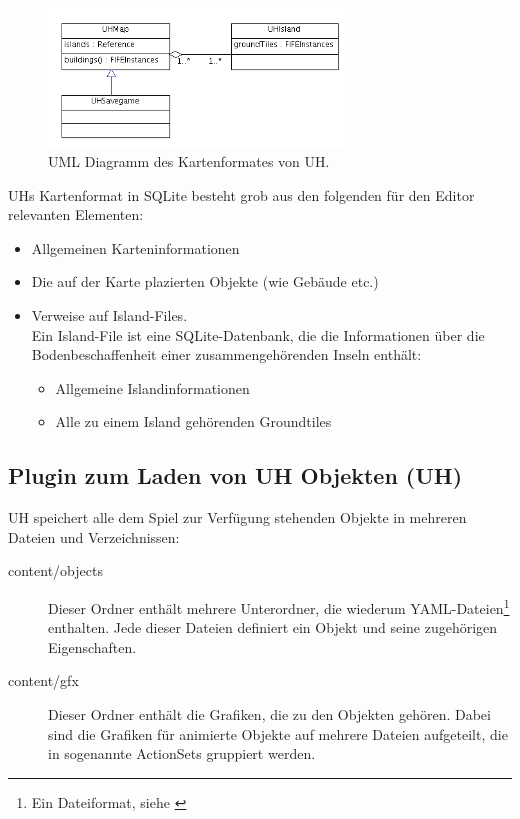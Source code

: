 %
%
\begin{figure}[htbp]
  \centering

    \includegraphics[width=0.7\textwidth]{gfx/klassendiagramm-UHSaveGame.png}

  \caption{UML Diagramm des Kartenformates von UH.}
  \label{figure:automaton-intersection}
\end{figure}

UHs Kartenformat in SQLite besteht grob aus den folgenden für den
Editor relevanten Elementen:
\begin{itemize}
  \item Allgemeinen Karteninformationen
  \item Die auf der Karte plazierten Objekte (wie Gebäude etc.)
  \item Verweise auf Island-Files. \\
  Ein Island-File ist eine SQLite-Datenbank,
  die die Informationen über die Bodenbeschaffenheit einer zusammengehörenden
  Inseln enthält:
  \begin{itemize}
    \item Allgemeine Islandinformationen
    \item Alle zu einem Island gehörenden Groundtiles
  \end{itemize}
\end{itemize}


\subsection{Plugin zum Laden von UH Objekten (UH)}
UH speichert alle dem Spiel zur Verfügung stehenden Objekte in mehreren Dateien
und Verzeichnissen:

\begin{description}
\item[content/objects] Dieser Ordner enthält mehrere Unterordner, die wiederum
YAML-Dateien\footnote{Ein Dateiformat, siehe \cite{yaml}} enthalten. Jede
dieser Dateien definiert ein Objekt und seine zugehörigen Eigenschaften.
\item[content/gfx] Dieser Ordner enthält die Grafiken, die zu den Objekten
gehören. Dabei sind die Grafiken für animierte Objekte auf mehrere Dateien
aufgeteilt, die in sogenannte ActionSets gruppiert werden.
\end{description}


